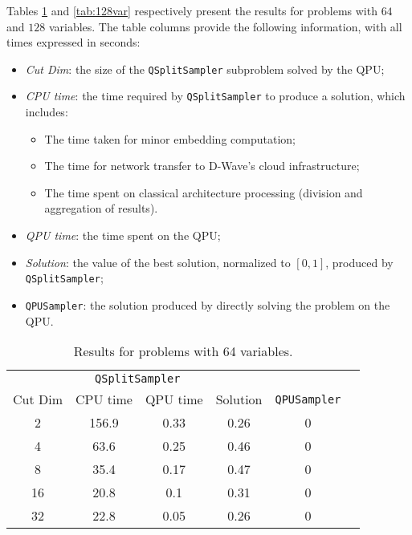 Tables \ref{tab:64var} and \ref{tab:128var} respectively present the results for problems with $64$ and $128$ variables. The table columns provide the following information, with all times expressed in seconds: 
\begin{itemize} 
    \item \emph{Cut Dim}: the size of the \texttt{QSplitSampler} subproblem solved by the QPU; 
    \item \emph{CPU time}: the time required by \texttt{QSplitSampler} to produce a solution, which includes: 
    \begin{itemize} 
        \item The time taken for minor embedding computation; 
        \item The time for network transfer to D-Wave's cloud infrastructure; 
        \item The time spent on classical architecture processing (division and aggregation of results). 
    \end{itemize} 
    \item \emph{QPU time}: the time spent on the QPU; 
    \item \emph{Solution}: the value of the best solution, normalized to $[0, 1]$, produced by \texttt{QSplitSampler}; 
    \item \texttt{QPUSampler}: the solution produced by directly solving the problem on the QPU. 
\end{itemize}

\begin{table}[H]
    \centering
    \begin{tabular}{cccc|cc}
        \toprule
        \multicolumn{4}{c}{\texttt{QSplitSampler}} & \\
        Cut Dim         & CPU time & QPU time & Solution & \texttt{QPUSampler} \\
        \midrule
        2               & 156.9    & 0.33     & 0.26     & 0        \\
        4               & 63.6     & 0.25     & 0.46     & 0        \\
        8               & 35.4     & 0.17     & 0.47     & 0        \\
        16              & 20.8     & 0.1      & 0.31     & 0        \\
        32              & 22.8     & 0.05     & 0.26     & 0        \\
        \bottomrule
    \end{tabular}
    \caption{Results for problems with 64 variables.}
    \label{tab:64var}
\end{table}

